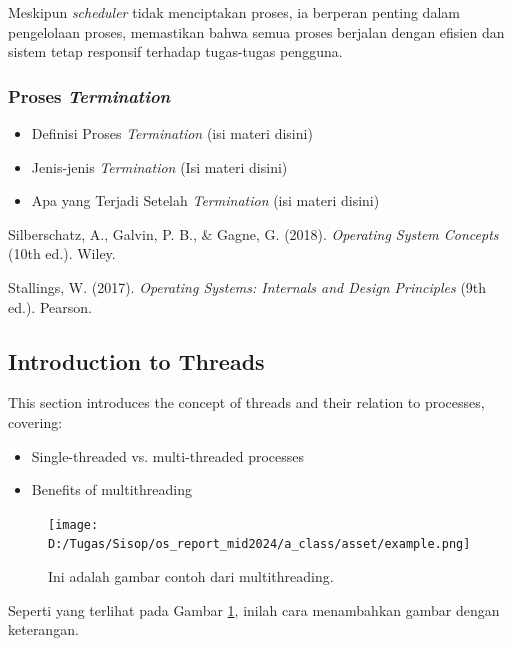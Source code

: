 \documentclass[12pt]{article}
\begin{document}
Meskipun \textit{scheduler} tidak menciptakan proses, ia berperan penting dalam pengelolaan proses, memastikan bahwa semua proses berjalan dengan efisien dan sistem tetap responsif terhadap tugas-tugas pengguna.

\subsubsection{Proses \textit{Termination}}
\begin{itemize}
    \item Definisi Proses \textit{Termination}
     (isi materi disini)

    \item Jenis-jenis \textit{Termination}
    (Isi materi disini)

    \item Apa yang Terjadi Setelah \textit{Termination}
    (isi materi disini)
\end{itemize} 



\begin{thebibliography}{99}

    Silberschatz, A., Galvin, P. B., \& Gagne, G. (2018). \textit{Operating System Concepts} (10th ed.). Wiley.

    Stallings, W. (2017). \textit{Operating Systems: Internals and Design Principles} (9th ed.). Pearson.
\end{thebibliography}

\subsection{Introduction to Threads}
This section introduces the concept of threads and their relation to processes, covering:
\begin{itemize}
    \item Single-threaded vs. multi-threaded processes
    \item Benefits of multithreading
\end{itemize}

\begin{figure}[h]
    \centering
    \texttt{[image: D:/Tugas/Sisop/os\_report\_mid2024/a\_class/asset/example.png]} %
    \caption{Ini adalah gambar contoh dari multithreading.}
    \label{fig:contoh_gambar}
\end{figure}


Seperti yang terlihat pada Gambar \ref{fig:contoh_gambar}, inilah cara menambahkan gambar dengan keterangan.
\end{document}
